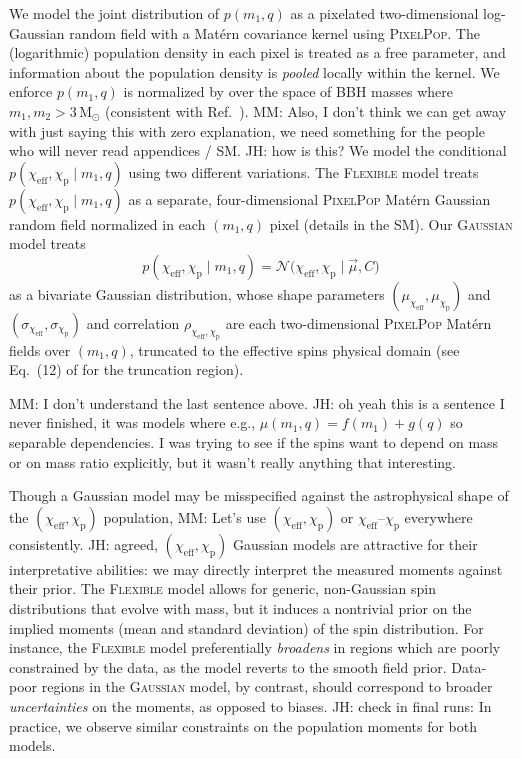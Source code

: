 \documentclass[%
    aps,
    prl,
    reprint,
    superscriptaddress,
    nolongbibliography,
    nobibnotes,
    nofootinbib,
    linenumbers,
    amsmath,amssymb,
]{revtex4-2}
\newcommand{\Msun}{\ensuremath{\mathrm{M}_{\odot}}}
\newcommand{\chieff}{\ensuremath{\chi_{\mathrm{eff}}}}
\newcommand{\chip}{\ensuremath{\chi_{\mathrm{p}}}}
\newcommand{\jh}[1]{{\color{orange}JH: #1}}
\newcommand{\mm}[1]{{\color{ForestGreen}MM: #1}}
\newcommand{\PixelPop}{\textsc{PixelPop}\xspace}
\newcommand{\flexiblespins}{\textsc{Flexible}\xspace}
\newcommand{\gaussianspins}{\textsc{Gaussian}\xspace}
\begin{document}
We model the joint distribution of $p(m_1, q)$ as a pixelated two-dimensional log-Gaussian random field with a Mat\'ern covariance kernel using \PixelPop \cite{Heinzel:2024hva, Heinzel:2024jlc, Alvarez-Lopez:2025ltt, Heinzel:}. The (logarithmic) population density in each pixel is treated as a free parameter, and information about the population density is \textit{pooled} locally within the kernel. We enforce $p(m_1, q)$ is normalized by over the space of \ac{BBH} masses where $m_1, m_2 > 3\,\Msun$ (consistent with Ref.~\cite{LIGOScientific:2026ctl}). 
\mm{Also, I don't think we can get away with just saying this with zero explanation, we need something for the people who will never read appendices / SM.} \jh{how is this?}
We model the conditional $p(\chieff, \chip \mid m_1, q)$ using two different variations. The \flexiblespins model treats $p(\chieff, \chip \mid m_1, q)$ as a separate, four-dimensional \PixelPop Mat\'ern Gaussian random field normalized in each $(m_1,q)$ pixel (details in the SM). Our \gaussianspins model treats
\begin{equation}
    p(\chieff, \chip \mid m_1, q) = \mathcal{N}\big(\chieff, \chip  \mid \vec{\mu}, C\big)
\end{equation}
as a bivariate Gaussian distribution, whose shape parameters $(\mu_{\chieff}, \mu_{\chip})$ and $(\sigma_{\chieff}, \sigma_{\chip})$ and correlation $\rho_{\chieff, \chip}$ are each two-dimensional \PixelPop Mat\'ern fields over $(m_1, q)$, truncated to the effective spins physical domain (see Eq.~(12) of \citet{iwaya_analytic_2025} for the truncation region). %

\mm{I don't understand the last sentence above.} \jh{oh yeah this is a sentence I never finished, it was models where e.g., $\mu(m_1, q) = f(m_1) + g(q)$ so separable dependencies. I was trying to see if the spins want to depend on mass or on mass ratio explicitly, but it wasn't really anything that interesting.}

Though a Gaussian model may be misspecified against the astrophysical shape of the $(\chieff, \chip)$ population,
\mm{Let's use $(\chieff,\chip)$ or $\chieff$--$\chip$ everywhere consistently.} \jh{agreed, $(\chieff, \chip)$}
Gaussian models are attractive for their interpretative abilities: we may directly interpret the measured moments against their prior. The \flexiblespins model allows for generic, non-Gaussian spin distributions that evolve with mass, but it induces a nontrivial prior on the implied moments (mean and standard deviation) of the spin distribution. For instance, the \flexiblespins model preferentially \textit{broadens} in regions which are poorly constrained by the data, as the model reverts to the smooth field prior. Data-poor regions in the \gaussianspins model, by contrast, should correspond to broader \textit{uncertainties} on the moments, as opposed to biases. \jh{check in final runs:} In practice, we observe similar constraints on the population moments for both models.
\end{document}
